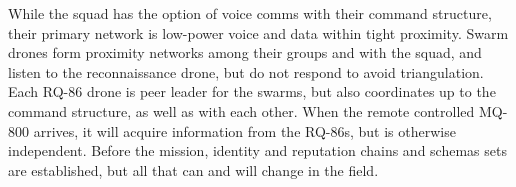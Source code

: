 While the squad has the option of voice comms with their command structure, their primary network is low-power voice and data within tight proximity.
Swarm drones form proximity networks among their groups and with the squad, and listen to the reconnaissance drone, but do not respond to avoid triangulation.
Each RQ-86 drone is peer leader for the swarms, but also coordinates up to the command structure, as well as with each other.
When the remote controlled MQ-800 arrives, it will acquire information from the RQ-86s, but is otherwise independent.
Before the mission, identity and reputation chains and schemas sets are established, but all that can and will change in the field.
